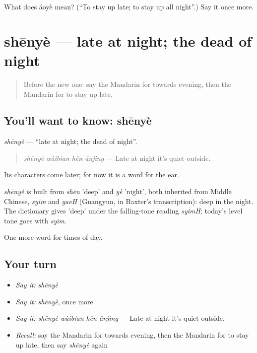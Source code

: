\begin{tcolorbox}[breakable,colback=teal!4,colframe=teal!35!black,title={Before you move on}]
What does áoyè mean? (\textquotedblleft{}To stay up late; to stay up all night\textquotedblright{}.) Say it once more.
\end{tcolorbox}
\section[shēnyè]{shēnyè — late at night; the dead of night}

\label{lesson:ZH-C169-shenye}



\begin{quote}
Before the new one: say the Mandarin for towards evening, then the Mandarin for to stay up late.
\end{quote}

\subsection*{You'll want to know: shēnyè}
\emph{shēnyè} — \textquotedblleft{}late at night; the dead of night\textquotedblright{}.

\begin{quote}
\emph{shēnyè wàibian hěn ānjìng} — Late at night it's quiet outside.
\end{quote}

Its characters come later; for now it is a word for the ear.

\begin{cousinweb}
\emph{shēnyè} is built from \emph{shēn} 'deep' and \emph{yè} 'night', both inherited from Middle Chinese, \emph{syim} and \emph{yaeH} (Guangyun, in Baxter's transcription): deep in the night. The dictionary gives 'deep' under the falling-tone reading \emph{syimH}; today's level tone goes with \emph{syim}.
\end{cousinweb}

\begin{grammarlens}[title={What you've built}]
One more word for times of day.
\end{grammarlens}

\subsection*{Your turn}
\begin{itemize}
\raggedright
  \item \emph{Say it:} \emph{shēnyè}
  \item \emph{Say it:} \emph{shēnyè}, once more
  \item \emph{Say it:} \emph{shēnyè wàibian hěn ānjìng} — Late at night it's quiet outside.
  \item \emph{Recall:} say the Mandarin for towards evening, then the Mandarin for to stay up late, then say \emph{shēnyè} again
\end{itemize}

